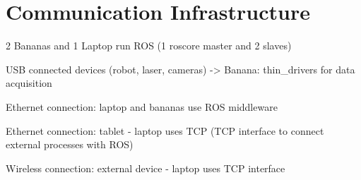 \section{Communication Infrastructure}

2 Bananas and 1 Laptop run ROS (1 roscore master and 2 slaves)

USB connected devices (robot, laser, cameras) -> Banana: thin\_drivers for data acquisition

Ethernet connection: laptop and bananas use ROS middleware

Ethernet connection: tablet - laptop uses TCP (TCP interface to connect external processes with ROS)

Wireless connection: external device - laptop uses TCP interface




